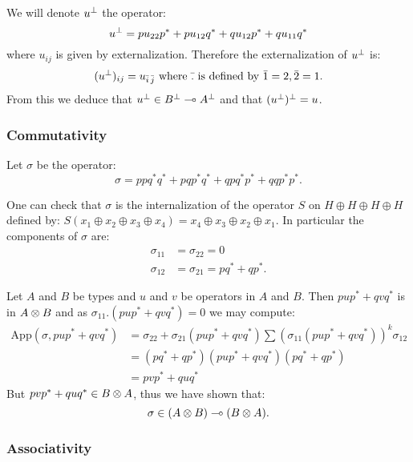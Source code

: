 We will denote \(u^\bot\) the operator:
\begin{equation*}
u^\bot = pu_{22}p^* + pu_{12}q^* + qu_{12}p^* + qu_{11}q^*
\end{equation*}
where \(u_{ij}\) is given by externalization. Therefore the
externalization of \(u^\bot\) is:
\begin{equation*}
(u^\bot)_{ij} = u_{\bar i\,\bar j}\text{ where $\bar .$ is defined by $\bar1 = 2, \bar2 = 1$}.
\end{equation*}
From this we deduce that \(u^\bot\in B^\bot\multimap A^\bot\) and that
\((u^\bot)^\bot = u\).

\subsubsection{Commutativity}\label{commutativity}

Let \(\sigma\) be the operator:
\begin{equation*}
\sigma = ppq^*q^* +pqp^*q^* + qpq^*p^* + qqp^*p^*.
\end{equation*}

One can check that \(\sigma\) is the internalization of the operator
\(S\) on \(H\oplus H\oplus H\oplus H\) defined by:
\(S(x_1\oplus x_2\oplus x_3\oplus x_4) = x_4\oplus x_3\oplus x_2\oplus x_1\).
In particular the components of \(\sigma\) are:
\begin{align*}
\sigma_{11} &= \sigma_{22} = 0 \\
\sigma_{12} &= \sigma_{21} = pq^* + qp^*.
\end{align*}

Let \(A\) and \(B\) be types and \(u\) and \(v\) be operators in \(A\)
and \(B\). Then \(pup^* + qvq^*\) is in \(A\otimes B\) and as
\(\sigma_{11}.(pup^* + qvq^*) = 0\) we may compute:
\begin{align*}
    \mathrm{App}(\sigma, pup^* + qvq^*) 
      & = \sigma_{22} + \sigma_{21}(pup^* + qvq^*)\sum(\sigma_{11}(pup^* + qvq^*))^k\sigma_{12}\\
      & = (pq^* + qp^*)(pup^* + qvq^*)(pq^* + qp^*)\\
      & = pvp^* + quq^*
\end{align*}
But \(pvp^* + quq^*\in B\otimes A\), thus we have shown that:
\begin{equation*}
\sigma\in (A\otimes B) \multimap (B\otimes A).
\end{equation*}

\subsubsection{Associativity}

